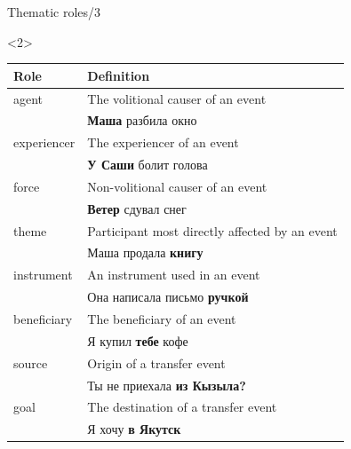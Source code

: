 \documentclass[10pt, compress]{beamer}
\begin{document}
\begin{frame}{Thematic roles/3}
\begin{onlyenv}<2>
\begin{center}
\begin{small}
\begin{tabular}{ll}
  \textbf{Role} & \textbf{Definition} \\
 \hline
  {\sc agent}  & The volitional causer of an event \\
               & \textbf{Маша} разбила окно \\
  {\sc experiencer} & The experiencer of an event  \\
                    & \textbf{У Саши} болит голова \\
  {\sc force} & Non-volitional causer of an event  \\
              & \textbf{Ветер} сдувал снег \\ 
  {\sc theme} & Participant most directly affected by an event  \\
              & Маша продала \textbf{книгу} \\
  {\sc instrument} & An instrument used in an event \\
                 & Она написала письмо \textbf{ручкой} \\
  {\sc beneficiary} & The beneficiary of an event \\
                 & Я купил \textbf{тебе} кофе \\
  {\sc source} & Origin of a transfer event \\
              & Ты не приехала \textbf{из Кызыла?} \\
  {\sc goal} & The destination of a transfer event \\
               & Я хочу \textbf{в Якутск} \\
 \hline
\end{tabular} 
\end{small}
\end{center}
\end{onlyenv}

\end{frame}
\end{document}
